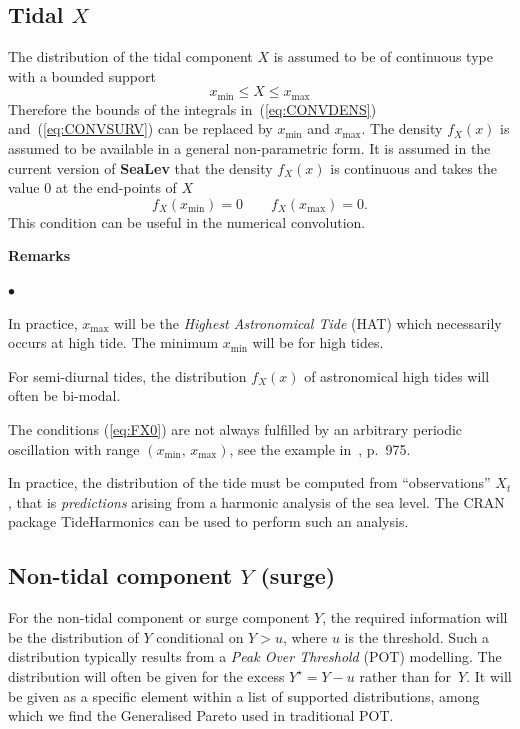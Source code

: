 \documentclass[11pt,a4paper]{report}\usepackage[]{graphicx}\usepackage[]{color}
\newcommand{\pkg}[1]{{\fontseries{b}\selectfont #1}}
\newcommand{\Low}[1]{#1_{\mathrm{min}}}
\newcommand{\Up}[1]{#1_{\mathrm{max}}}
\newenvironment{remarks}
   {\medskip \par \noindent%
    \textbf{Remarks}\\\vspace{-1.5em}\nopagebreak%
    \begin{list}{$\bullet$}{%
       \setlength{\labelwidth}{-6pt}%
       \setlength{\leftmargin}{0pt}%
       \setlength{\rightmargin}{0pt}%
       \small
     }
   }%
   {\end{list} \par \noindent}
\begin{document}
 
\subsection{Tidal $X$}
The distribution of the tidal component $X$ is assumed to be of
continuous type with a bounded support 
$$
\Low{x} \leqslant X \leqslant \Up{x}
$$
Therefore the bounds of the integrals in~(\ref{eq:CONVDENS})
and~(\ref{eq:CONVSURV}) can be replaced by $\Low{x}$ and
$\Up{x}$. The density $f_X(x)$ is assumed to be available in
a general non-parametric form.   It is assumed
in the current version of \textbf{SeaLev} that the density $f_X(x)$ is
continuous and takes the value $0$ at the end-points of $X$
\begin{equation}
   \label{eq:FX0}
   f_X(\Low{x}) = 0 \qquad f_X(\Up{x}) = 0.
\end{equation}
This condition can be useful in the numerical convolution.

\begin{remarks}
  
\item In practice, $\Up{x}$ will be the \textit{Highest Astronomical
    Tide} (HAT) which necessarily occurs at high tide. The minimum
  $\Low{x}$ will be for high tides. 

\item For semi-diurnal tides, the distribution $f_X(x)$ of astronomical high
  tides will often be bi-modal.

\item The conditions (\ref{eq:FX0}) are not always fulfilled by an arbitrary
  periodic oscillation with range $(\Low{x},\,\Up{x})$,
  see the example in~\cite{PUGHVASSIE80}, p.~975.
  
\item In practice, the distribution of the tide must be computed from
  ``observations'' $X_t$, that is \textit{predictions} arising from a
  harmonic analysis of the sea level. The CRAN package
  \pkg{TideHarmonics} \cite{PACKTideHarmonics} can be used to perform
  such an analysis.
\end{remarks}

\subsection{Non-tidal  component  $Y$ (surge)}
For the non-tidal component or surge component $Y$, the required
information will be the distribution of $Y$ conditional on $
Y> u$, where $u$ is the threshold.  Such a distribution typically
results from a \textit{Peak Over Threshold} (POT) modelling.
 The distribution will often be
given for the excess $Y^\star = Y-u$ rather than for~$Y$. It will be
given as a specific element within a list of supported distributions,
among which we find the Generalised Pareto used in traditional POT.
\end{document}
